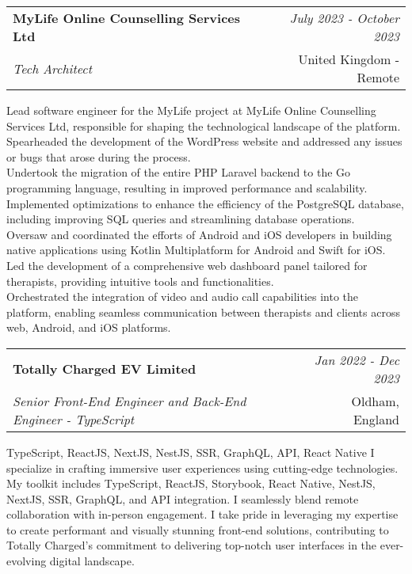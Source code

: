 \documentclass[a4paper,10pt]{article}
\makeatletter
\newcommand{\resumeSubheading}[4]{
	\vspace{0.5mm}\item
	\begin{tabular*}{0.98\textwidth}[t]{l@{\extracolsep{\fill}}r}
		\textbf{#1} & \textit{\footnotesize{#4}} \\
		\textit{\footnotesize{#3}} &  \footnotesize{#2}\\
	\end{tabular*}
	\vspace{-2.4mm}
}
\newcommand{\resumeItemListStart}{\begin{justify}\begin{itemize}[leftmargin=3ex, rightmargin=2ex, noitemsep,labelsep=1.2mm,itemsep=0mm]\small}
\newcommand{\resumeItemListEnd}{\end{itemize}\end{justify}\vspace{-2mm}}
\makeatother
\begin{document}
\vspace{-1mm}
\resumeSubheading
{MyLife Online Counselling Services Ltd}{United Kingdom - Remote}
{Tech Architect}{July 2023 - October 2023}
\resumeItemListStart
Lead software engineer for the MyLife project at MyLife Online Counselling Services Ltd, responsible for shaping the technological landscape of the platform. \\
Spearheaded the development of the WordPress website and addressed any issues or bugs that arose during the process. \\
Undertook the migration of the entire PHP Laravel backend to the Go programming language, resulting in improved performance and scalability. \\
Implemented optimizations to enhance the efficiency of the PostgreSQL database, including improving SQL queries and streamlining database operations. \\
Oversaw and coordinated the efforts of Android and iOS developers in building native applications using Kotlin Multiplatform for Android and Swift for iOS. \\
Led the development of a comprehensive web dashboard panel tailored for therapists, providing intuitive tools and functionalities. \\
Orchestrated the integration of video and audio call capabilities into the platform, enabling seamless communication between therapists and clients across web, Android, and iOS platforms.
\resumeItemListEnd

\vspace{-1mm}
\resumeSubheading
{Totally Charged EV Limited}{Oldham, England}
{Senior Front-End Engineer and Back-End Engineer - TypeScript}{Jan 2022 - Dec 2023}
\resumeItemListStart
{TypeScript, ReactJS, NextJS, NestJS, SSR, GraphQL, API, React Native}
I specialize in crafting immersive user experiences using cutting-edge technologies. My toolkit includes TypeScript, ReactJS, Storybook, React Native, NestJS, NextJS, SSR, GraphQL, and API integration. I seamlessly blend remote collaboration with in-person engagement. I take pride in leveraging my expertise to create performant and visually stunning front-end solutions, contributing to Totally Charged's commitment to delivering top-notch user interfaces in the ever-evolving digital landscape.
\resumeItemListEnd
\end{document}
